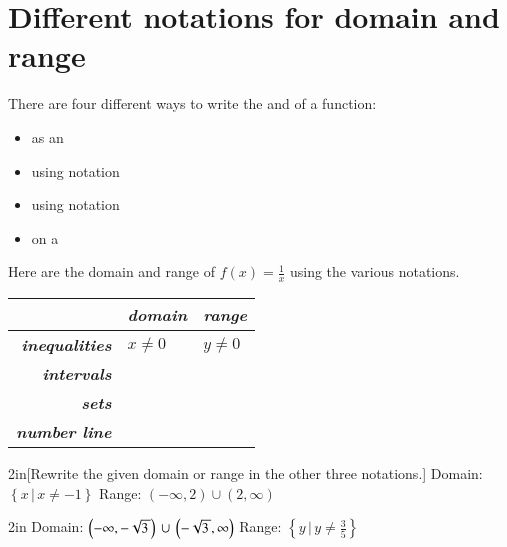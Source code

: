 \section{Different notations for domain and range}

There are four different ways to write the  and  
of a function:
\begin{itemize}[nosep]
    \item as an 
    \item using  notation
    \item using  notation
    \item on a 
\end{itemize}

Here are the domain and range of $f(x) = \frac{1}{x}$ using the various notations.

\begin{myCenteredBox}[width=6in, colback=white,]
\begin{center}
\large
\renewcommand{\arraystretch}{1.5}
\begin{tabular}{r||p{2in}|p{2in}}
                                     & {\bfseries\itshape domain} & {\bfseries\itshape range} \\ \hline
    {\bfseries\itshape inequalities} & $x \neq 0$ & $y \neq 0$ \\
    {\bfseries\itshape intervals}    & & \\
    {\bfseries\itshape sets}         & & \\
    {\bfseries\itshape number line}  & & \\
\end{tabular}
\end{center}
\end{myCenteredBox}


\begin{my2Problems}{2in}[Rewrite the given domain or range in the other three notations.]
    {
        Domain: $\left\{x \, | \, x \neq -1 \right\}$
    }
    {
        Range: $ (-\infty,2) \cup (2,\infty) $
    }
\end{my2Problems}
\begin{my2Problems}{2in}
    {
        Domain: $ \left(-\infty,-\myRoot{3}\right) \,\cup\, \left(-\myRoot{3},\infty\right) $
    }
    {
        Range: $\left\{y \, | \, y \neq \frac{3}{5} \right\}$
    }
\end{my2Problems}

